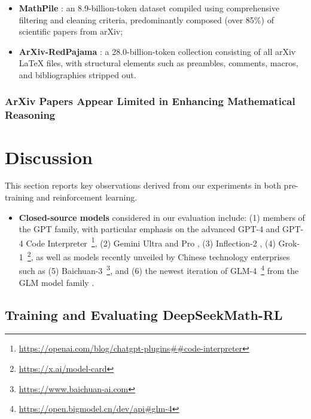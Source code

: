 \begin{itemize}[topsep=0pt]
    \item \textbf{MathPile} \citep{mathpile}: an 8.9-billion-token dataset compiled using comprehensive filtering and cleaning criteria, predominantly composed (over 85\%) of scientific papers from arXiv;
    \item \textbf{ArXiv-RedPajama} \citep{redpajama}: a 28.0-billion-token collection consisting of all arXiv LaTeX files, with structural elements such as preambles, comments, macros, and bibliographies stripped out.
\end{itemize}

\subsubsection{ArXiv Papers Appear Limited in Enhancing Mathematical Reasoning}

\section{Discussion}
This section reports key observations derived from our experiments in both pre-training and reinforcement learning.

\begin{itemize}[topsep=0pt]
    \item \textbf{Closed-source models} considered in our evaluation include: (1) members of the GPT family, with particular emphasis on the advanced GPT-4 \citep{gpt4} and GPT-4 Code Interpreter~\footnote{\url{https://openai.com/blog/chatgpt-plugins\#\#code-interpreter}}, (2) Gemini Ultra and Pro \citep{gemini}, (3) Inflection-2 \citep{inflection-2}, (4) Grok-1~\footnote{\url{https://x.ai/model-card}}, as well as models recently unveiled by Chinese technology enterprises such as (5) Baichuan-3~\footnote{\url{https://www.baichuan-ai.com}}, and (6) the newest iteration of GLM-4~\footnote{\url{https://open.bigmodel.cn/dev/api\#glm-4}} from the GLM model family \citep{glm}.
\end{itemize}

\subsection{Training and Evaluating DeepSeekMath-RL}

